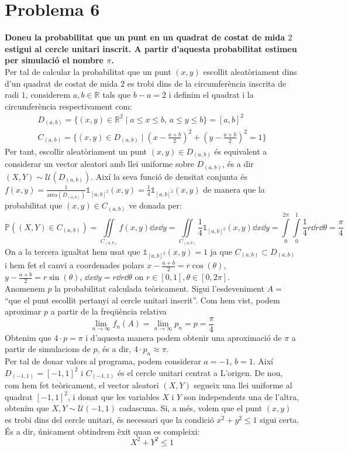 \documentclass[11pt,a4paper]{article}
\begin{document}
\section*{Problema 6}
\textbf{Doneu la probabilitat que un punt en un quadrat de costat de mida $2$ estigui al cercle unitari inscrit. A partir d'aquesta probabilitat estimeu per simulació el nombre $\pi$.}\\
Per tal de calcular la probabilitat que un punt $(x,y)$ escollit aleatòriament dins d'un quadrat de costat de mida $2$ es trobi dins de la circumferència inscrita de radi $1$, considerem $a,b\in \mathbb{R}$ tals que $b-a=2$ i definim el quadrat i la circumferència respectivament com:
\begin{gather*}
  D_{(a,b)}=\{(x,y)\in \mathbb{R}^2\mid a\leq x\leq b\text{,  } a\leq y\leq b\}=[a,b]^2\\
  \textstyle C_{(a,b)}=\{(x,y)\in D_{(a,b)}\mid (x-\frac{a+b}{2})^2+(y-\frac{a+b}{2})^2=1 \}
\end{gather*}
Per tant, escollir aleatòriament un punt $(x,y)\in D_{(a,b)}$ és equivalent a considerar un vector aleatori amb llei uniforme sobre $D_{(a,b)}$, és a dir $(X,Y)\sim \mathcal{U}(D_{(a,b)})$. Així la seva funció de densitat conjunta és $f(x,y)=\frac{1}{\text{area}(D_{(a,b)})}\mathds{1}_{[a,b]^2}(x,y)=\frac{1}{4}\mathds{1}_{[a,b]^2}(x,y)$ de manera que la probabilitat que $(x,y)\in C_{(a,b)}$ ve donada per:
\begin{equation*}
  \mathbb{P}((X,Y)\in C_{(a,b)})=\iint \limits_{C_{(a,b)}} f(x,y)\dd x\dd y=\iint \limits_{C_{(a,b)}} \frac{1}{4}\mathds{1}_{[a,b]^2}(x,y)\dd x\dd y= \int \limits_{0}^{2\pi}\int \limits_{0}^{1}\frac{1}{4}r\dd r\dd \theta=\frac{\pi}{4}
\end{equation*} On a la tercera igualtat hem usat que $\mathds{1}_{[a,b]^2}(x,y)=1$ ja que $C_{(a,b)}\subset D_{(a,b)}$ i hem fet el canvi a coordenades polars $x-\frac{a+b}{2}=r\cos(\theta)$, $y-\frac{a+b}{2}=r\sin(\theta)$, $\dd x\dd y=r\dd r\dd \theta$ on $r\in[0,1],\theta\in[0,2\pi]$.\\
Anomenem $p$ la probabilitat calculada teòricament. Sigui l'esdeveniment $A=$ ``que el punt escollit pertanyi al cercle unitari inscrit''. Com hem vist, podem aproximar $p$ a partir de la freqüència relativa \[ \lim_{n\to\infty} f_n(A) =\lim_{n\to\infty} p_n=p=\frac{\pi}{4}\] Obtenim que $4\cdot p=\pi$ i d'aquesta manera podem obtenir una aproximació de $\pi$ a partir de simulacions de $p$, és a dir,  $4\cdot p_n \approx\pi $.\\ Per tal de donar valors al programa, podem considerar $a=-1$, $b=1$. Així $D_{(-1,1)}=[-1,1]^2$ i $C_{(-1,1)}$ és el cercle unitari centrat a L'origen. De nou, com hem fet teòricament, el vector aleatori $(X,Y)$ segueix una llei uniforme al quadrat $[-1,1]^2$, i donat que les variables $X$ i $Y$ son independents una de l'altra, obtenim que $X,Y\sim \mathcal{U}(-1,1)$ cadascuna. Si, a més, volem que el punt $(x,y)$ es trobi dins del cercle unitari, és necessari que la condició $x^2+y^2\leq1$ sigui certa. És a dir, únicament obtindrem èxit quan es compleixi: $$X^2+Y^2\leq1$$
\end{document}
